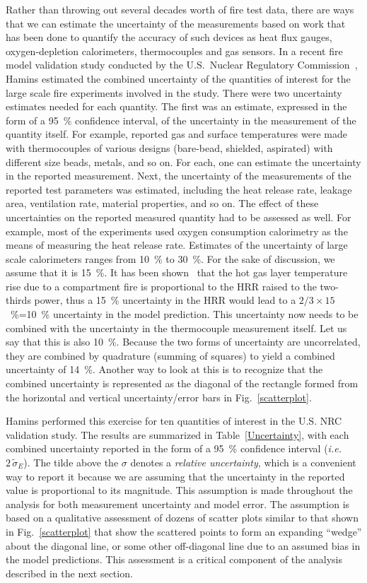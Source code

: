 Rather than throwing out several decades worth of fire test data, there are ways that we can estimate the uncertainty of the measurements based on work
that has been done to quantify the accuracy of such devices as heat flux gauges, oxygen-depletion calorimeters, thermocouples and gas sensors.
In a recent fire model validation study conducted by the U.S.~Nuclear Regulatory Commission~\cite{NUREG_1824}, Hamins estimated the combined
uncertainty of the quantities of interest for the large scale fire experiments involved in the study. There were
two uncertainty estimates needed for each quantity. The first was an estimate, expressed in the form of a 95~\% confidence interval, of the
uncertainty in the measurement of the quantity itself. For example, reported gas and surface temperatures were made with thermocouples of various designs (bare-bead,
shielded, aspirated) with different size beads, metals, and so on. For each, one can estimate the uncertainty in the reported measurement. Next, the
uncertainty of the measurements of the reported test parameters was estimated, including the heat release rate, leakage area, ventilation rate, material
properties, and so on. The effect of these uncertainties on the reported measured quantity had to be assessed as well. For example, most of the
experiments used oxygen consumption calorimetry as the means of measuring the heat release rate.
Estimates of the uncertainty of large scale calorimeters ranges from 10~\% to 30~\%. For the sake of discussion, we assume that it is 15~\%. 
It has been shown~\cite{SFPE:Walton} that the hot gas layer temperature rise due to
a compartment fire is proportional to the HRR raised to the two-thirds power, thus a 15~\% uncertainty in the HRR would lead to a $2/3 \times 15$~\%=10~\%
uncertainty in the model prediction. This uncertainty now needs to be combined with the uncertainty in the thermocouple measurement itself. Let us say that
this is also 10~\%. Because the two forms of uncertainty are uncorrelated, they are combined by quadrature (summing of squares) to yield a combined
uncertainty of 14~\%. Another way to look at this is to recognize that the combined uncertainty is represented as the diagonal of the rectangle formed
from the horizontal and vertical uncertainty/error bars in Fig.~\ref{scatterplot}.

Hamins performed this exercise for ten quantities of interest in the U.S. NRC validation study. The results are summarized in Table~\ref{Uncertainty}, with
each combined uncertainty reported in the form of a 95~\% confidence interval ({\em i.e.} $2 \, \widetilde{\sigma}_E$). The tilde above the $\sigma$ denotes a
{\em relative uncertainty}, which is a convenient way to report it because we are assuming that the uncertainty in the reported value is proportional to
its magnitude. This assumption is made throughout the analysis for both measurement uncertainty and model error. The assumption is based on a
qualitative assessment of dozens of scatter plots similar to that shown in Fig.~\ref{scatterplot} that show the scattered points to form an expanding ``wedge''
about the diagonal line, or some other off-diagonal line due to an assumed bias in the model predictions. This assessment is a critical component of the
analysis described in the next section.

